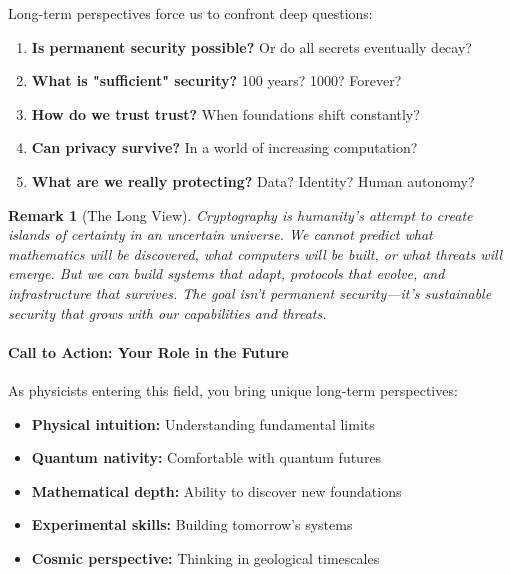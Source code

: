 \documentclass[11pt,a4paper]{article}
\newtheorem{remark}{Remark}
\begin{document}
Long-term perspectives force us to confront deep questions:

\begin{enumerate}
    \item \textbf{Is permanent security possible?} Or do all secrets eventually decay?
    
    \item \textbf{What is "sufficient" security?} 100 years? 1000? Forever?
    
    \item \textbf{How do we trust trust?} When foundations shift constantly?
    
    \item \textbf{Can privacy survive?} In a world of increasing computation?
    
    \item \textbf{What are we really protecting?} Data? Identity? Human autonomy?
\end{enumerate}

\begin{remark}[The Long View]
Cryptography is humanity's attempt to create islands of certainty in an uncertain universe. We cannot predict what mathematics will be discovered, what computers will be built, or what threats will emerge. But we can build systems that adapt, protocols that evolve, and infrastructure that survives. The goal isn't permanent security—it's sustainable security that grows with our capabilities and threats.
\end{remark}

\paragraph{Call to Action: Your Role in the Future}

As physicists entering this field, you bring unique long-term perspectives:

\begin{itemize}
    \item \textbf{Physical intuition:} Understanding fundamental limits
    \item \textbf{Quantum nativity:} Comfortable with quantum futures
    \item \textbf{Mathematical depth:} Ability to discover new foundations
    \item \textbf{Experimental skills:} Building tomorrow's systems
    \item \textbf{Cosmic perspective:} Thinking in geological timescales
\end{itemize}
\end{document}
